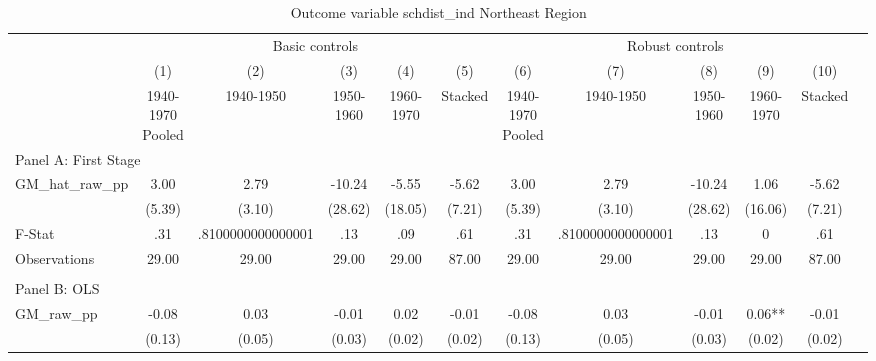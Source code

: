  \begin{table}[htbp]\centering {} \begin{threeparttable} \caption{Outcome variable schdist\_ind Northeast Region} \begin{tabular}{l*{11}{c}} \toprule
          &\multicolumn{5}{c}{Basic controls}                                   &\multicolumn{5}{c}{Robust controls}                                  \\\cmidrule(lr){2-6}\cmidrule(lr){7-11}
          &\multicolumn{1}{c}{(1)}&\multicolumn{1}{c}{(2)}&\multicolumn{1}{c}{(3)}&\multicolumn{1}{c}{(4)}&\multicolumn{1}{c}{(5)}&\multicolumn{1}{c}{(6)}&\multicolumn{1}{c}{(7)}&\multicolumn{1}{c}{(8)}&\multicolumn{1}{c}{(9)}&\multicolumn{1}{c}{(10)}\\
          &\multicolumn{1}{c}{1940-1970 Pooled}&\multicolumn{1}{c}{1940-1950}&\multicolumn{1}{c}{1950-1960}&\multicolumn{1}{c}{1960-1970}&\multicolumn{1}{c}{Stacked}&\multicolumn{1}{c}{1940-1970 Pooled}&\multicolumn{1}{c}{1940-1950}&\multicolumn{1}{c}{1950-1960}&\multicolumn{1}{c}{1960-1970}&\multicolumn{1}{c}{Stacked}\\
\cmidrule(lr){1-11}
\multicolumn{10}{l}{Panel A: First Stage}\\
\cmidrule(lr){1-11}
GM\_hat\_raw\_pp&      3.00   &      2.79   &    -10.24   &     -5.55   &     -5.62   &      3.00   &      2.79   &    -10.24   &      1.06   &     -5.62   \\
          &    (5.39)   &    (3.10)   &   (28.62)   &   (18.05)   &    (7.21)   &    (5.39)   &    (3.10)   &   (28.62)   &   (16.06)   &    (7.21)   \\
\midrule
F-Stat    &       .31   &.8100000000000001   &       .13   &       .09   &       .61   &       .31   &.8100000000000001   &       .13   &         0   &       .61   \\
Observations&     29.00   &     29.00   &     29.00   &     29.00   &     87.00   &     29.00   &     29.00   &     29.00   &     29.00   &     87.00   \\
\cmidrule[\heavyrulewidth](lr){1-11} \\ \cmidrule[\heavyrulewidth](lr){1-11}
\multicolumn{10}{l}{Panel B: OLS}\\
\cmidrule(lr){1-11}
GM\_raw\_pp &     -0.08   &      0.03   &     -0.01   &      0.02   &     -0.01   &     -0.08   &      0.03   &     -0.01   &      0.06** &     -0.01   \\
          &    (0.13)   &    (0.05)   &    (0.03)   &    (0.02)   &    (0.02)   &    (0.13)   &    (0.05)   &    (0.03)   &    (0.02)   &    (0.02)   \\

\end{tabular}
\end{threeparttable}
\end{table}
